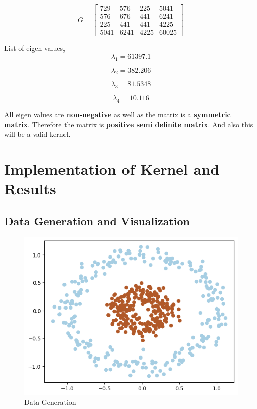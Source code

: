 \documentclass[11pt,a4paper]{article}
\begin{document}
\newpage

\begin{equation}
    G = 
    \begin{bmatrix}
        729 & 576 & 225 & 5041 \\
        576 & 676 & 441 & 6241 \\
        225 & 441 & 441 & 4225 \\
        5041 & 6241 & 4225 & 60025
    \end{bmatrix}
\end{equation}

List of eigen values,
\begin{equation}
    \lambda_1 = 61397.1
\end{equation}

\begin{equation}
    \lambda_2 = 382.206
\end{equation}

\begin{equation}
    \lambda_3 = 81.5348
\end{equation}

\begin{equation}
    \lambda_4 = 10.116
\end{equation}

All eigen values are \textbf{non-negative} as well as the matrix is a \textbf{symmetric matrix}. Therefore the matrix is \textbf{positive semi definite matrix}. And also this will be a valid kernel.

\section{Implementation of Kernel and Results}

\subsection{Data Generation and Visualization}

\lstset{style=mystyle}


{\begin{figure}[h]
    \centering
    \includegraphics[width=1.0\linewidth]{images/1.png}
    \caption{Data Generation}
\end{figure}}
\end{document}
